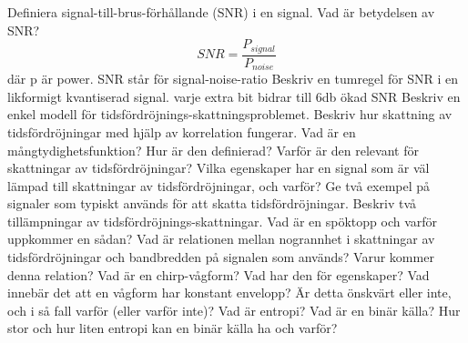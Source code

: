 \documentclass[a4paper,11pt]{article}
\begin{document}
\newline
\newline
Definiera signal-till-brus-förhållande (SNR) i en signal. Vad är betydelsen av SNR?
$$SNR=\frac{P_{signal}}{P_{noise}}$$ där p är power. SNR står för signal-noise-ratio
\newline
\newline
Beskriv en tumregel för SNR i en likformigt kvantiserad signal. 
varje extra bit bidrar till 6db ökad SNR
\newline
\newline
Beskriv en enkel modell för tidsfördröjnings-skattningsproblemet.
\newline
\newline
Beskriv hur skattning av tidsfördröjningar med hjälp av korrelation fungerar.
\newline
\newline
Vad är en mångtydighetsfunktion? Hur är den definierad? Varför är den relevant för 
skattningar av tidsfördröjningar?
\newline
\newline
Vilka egenskaper har en signal som är väl lämpad till skattningar av tidsfördröjningar, och 
varför?
\newline
\newline
Ge två exempel på signaler som typiskt används för att skatta tidsfördröjningar.
\newline
\newline
Beskriv två tillämpningar av tidsfördröjnings-skattningar.
\newline
\newline
Vad är en spöktopp och varför uppkommer en sådan?
\newline
\newline
Vad är relationen mellan nogrannhet i skattningar av tidsfördröjningar och bandbredden på 
signalen som används? Varur kommer denna relation?
\newline
\newline
Vad är en chirp-vågform?  Vad har den för egenskaper?
\newline
\newline
Vad innebär det att en vågform har konstant envelopp?  Är detta önskvärt eller inte, och i så 
fall varför (eller varför inte)?
\newline
\newline
Vad är entropi?
\newline
\newline
Vad är en binär källa?  Hur stor och hur liten entropi kan en binär källa ha och varför?
\end{document}
